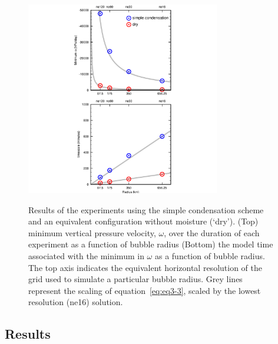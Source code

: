 \begin{figure}
\begin{center}
\noindent\includegraphics[width=20pc,angle=0]{chapter3/Figure3_crop.pdf}\\
\end{center}
\caption{Results of the experiments using the simple condensation scheme and an equivalent configuration without moisture (`dry’). (Top) minimum vertical pressure velocity, $\omega$, over the duration of each experiment as a function of bubble radius (Bottom) the model time associated with the minimum in $\omega$ as a function of bubble radius. The top axis indicates the equivalent horizontal resolution of the grid used to simulate a particular bubble radius. Grey lines represent the scaling of equation~\ref{eq:eq3-3}, scaled by the lowest resolution (ne16) solution.}
\label{fig:figure3-3}
\end{figure}

\subsection{Results}
